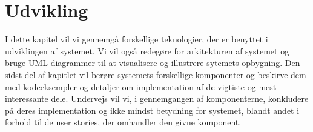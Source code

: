 \chapter{Udvikling}
I dette kapitel vil vi gennemgå forskellige teknologier, der er benyttet i udviklingen af systemet.
Vi vil også redegøre for arkitekturen af systemet og bruge UML diagrammer til at visualisere og illustrere sytemets opbygning.
Den sidst del af kapitlet vil berøre systemets forskellige komponenter og beskirve dem med kodeeksempler og detaljer om implementation af de vigtiste og mest interessante dele. 
Undervejs vil vi, i gennemgangen af komponenterne, konkludere på deres implementation og ikke mindst betydning for systemet, blandt andet i forhold til de user stories, der omhandler den givne komponent.









